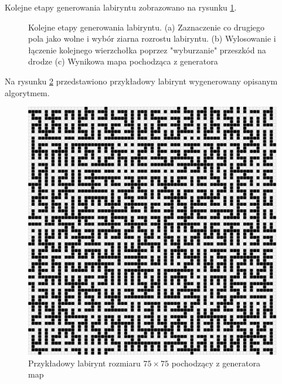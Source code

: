 Kolejne etapy generowania labiryntu zobrazowano na rysunku \ref{fig:etapy-generowania}.

\begin{figure}
    \centering
        \qquad
        \qquad
    \caption{Kolejne etapy generowania labiryntu.
    (a) Zaznaczenie co drugiego pola jako wolne i wybór ziarna rozrostu labiryntu.
    (b) Wylosowanie i łączenie kolejnego wierzchołka poprzez "wyburzanie" przeszkód na drodze
    (c) Wynikowa mapa pochodząca z generatora}
    \label{fig:etapy-generowania}
\end{figure}

Na rysunku \ref{fig:maze75-75} przedstawiono przykładowy labirynt wygenerowany opisanym algorytmem.
\begin{figure}
	\centering
	\includegraphics[width=0.6\columnwidth]{img/mazegen/maze-75-75}
	\caption{Przykładowy labirynt rozmiaru $75 \times 75$ pochodzący z generatora map}
	\label{fig:maze75-75}
\end{figure}

